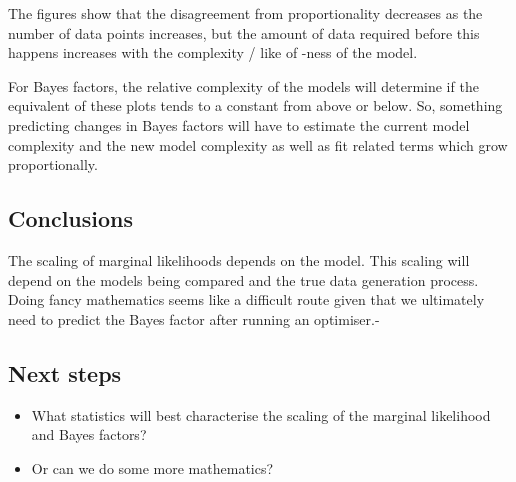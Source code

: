 \documentclass[twoside,11pt]{article}
\begin{document}
The figures show that the disagreement from proportionality decreases as the number of data points increases, but the amount of data required before this happens increases with the complexity / like of \iid-ness of the model.

For Bayes factors, the relative complexity of the models will determine if the equivalent of these plots tends to a constant from above or below.
So, something predicting changes in Bayes factors will have to estimate the current model complexity and the new model complexity as well as fit related terms which grow proportionally.

\subsection{Conclusions}

The scaling of marginal likelihoods depends on the model.
This scaling will depend on the models being compared and the true data generation process.
Doing fancy mathematics seems like a difficult route given that we ultimately need to predict the Bayes factor after running an optimiser.-

\subsection{Next steps}

\begin{itemize}
  \item What statistics will best characterise the scaling of the marginal likelihood and Bayes factors?
  \item Or can we do some more mathematics?
\end{itemize}

\newpage


\vskip 0.2in

\end{document}
